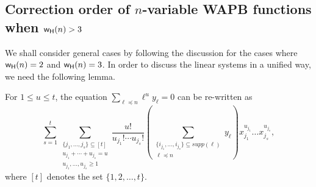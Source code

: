\documentclass[11pt]{llncs}
\begin{document}
%
%
%
%
%



\subsection{Correction order of $n$-variable WAPB functions when $\mathsf{w_H}(n)>3$}

We shall consider general cases by following the discussion for the cases where $\mathsf{w_H}(n)=2$ and $\mathsf{w_H}(n)=3$.
In order to discuss the linear systems in a unified way, we need the following lemma.

\begin{lemma}\label{lem:Represention_Equations}
	For $1\leq u \leq t$, the equation $\sum_{\ell \preceq n } \ell^uy_{\ell}  = 0$ can be re-written as
	\begin{equation}\label{key}
	\sum_{s=1}^t\sum\limits_{\substack{\{j_1,\dots, j_s\} \subseteq [t] \\ u_{j_1}+\cdots+ u_{j_s}=u \\  u_{j_1},\dots,u_{j_s}\geq 1}}  \frac{u!}{u_{j_1}!\cdots u_{j_s}!} \left(  \sum_{\substack{\{i_{j_1},\dots, i_{j_s}\} \subseteq supp(\ell)   \\ \ell\preceq n }}  y_{\ell} \right)  x_{j_1}^{u_{j_1}}\dots x_{j_s}^{u_{j_s}},
	\end{equation} where $[t]$ denotes the set $\{1,2,\dots, t\}$.
\end{lemma}
\end{document}
